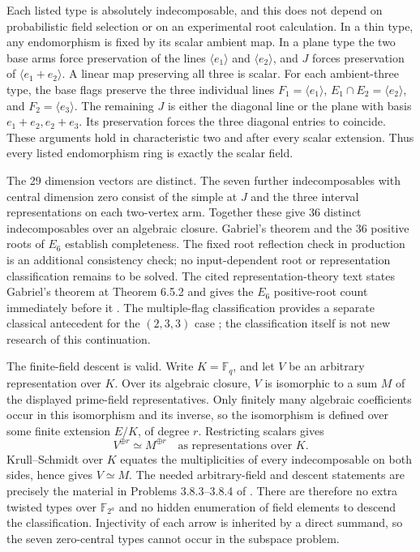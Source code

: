 \documentclass[11pt]{article}
\newcommand{\F}{\mathbb F}
\begin{document}
Each listed type is absolutely indecomposable, and this does not depend on
probabilistic field selection or on an experimental root calculation. In a
thin type, any endomorphism is fixed by its scalar ambient map. In a plane
type the two base arms force preservation of the lines $\langle e_1\rangle$
and $\langle e_2\rangle$, and $J$ forces preservation of
$\langle e_1+e_2\rangle$. A linear map preserving all three is scalar.
For each ambient-three type, the base flags preserve the three individual
lines $F_1=\langle e_1\rangle$, $E_1\cap E_2=\langle e_2\rangle$,
and $F_2=\langle e_3\rangle$. The remaining $J$ is either the diagonal
line or the plane with basis $e_1+e_2,e_2+e_3$. Its preservation forces
the three diagonal entries to coincide. These arguments hold in
characteristic two and after every scalar extension. Thus every listed
endomorphism ring is exactly the scalar field.

The 29 dimension vectors are distinct. The seven further indecomposables
with central dimension zero consist of the simple at $J$ and the three
interval representations on each two-vertex arm. Together these give
36 distinct indecomposables over an algebraic closure. Gabriel's theorem
and the 36 positive roots of $E_6$ establish completeness. The fixed root
reflection check in production is an additional consistency check; no
input-dependent root or representation classification remains to be solved.
The cited representation-theory text states Gabriel's theorem at
Theorem 6.5.2 and gives the $E_6$ positive-root count immediately before it
\cite{etingof}. The multiple-flag classification provides a separate classical
antecedent for the $(2,3,3)$ case \cite{mwz}; the classification itself is not
new research of this continuation.

The finite-field descent is valid. Write $K=\F_q$, and let $V$ be an
arbitrary representation over $K$. Over its algebraic closure, $V$ is
isomorphic to a sum $M$ of the displayed prime-field representatives. Only
finitely many algebraic coefficients occur in this isomorphism and its
inverse, so the isomorphism is defined over some finite extension $E/K$,
of degree $r$. Restricting scalars gives
\[
 V^{\oplus r}\simeq M^{\oplus r}
 \quad\text{as representations over }K.
\]
Krull--Schmidt over $K$ equates the multiplicities of every indecomposable
on both sides, hence gives $V\simeq M$. The needed arbitrary-field and
descent statements are precisely the material in Problems 3.8.3--3.8.4
of \cite{etingof}. There are therefore no extra twisted types over
$\F_{2^a}$ and no hidden enumeration of field elements to descend the
classification. Injectivity of each arrow is inherited by a direct summand,
so the seven zero-central types cannot occur in the subspace problem.
\end{document}
